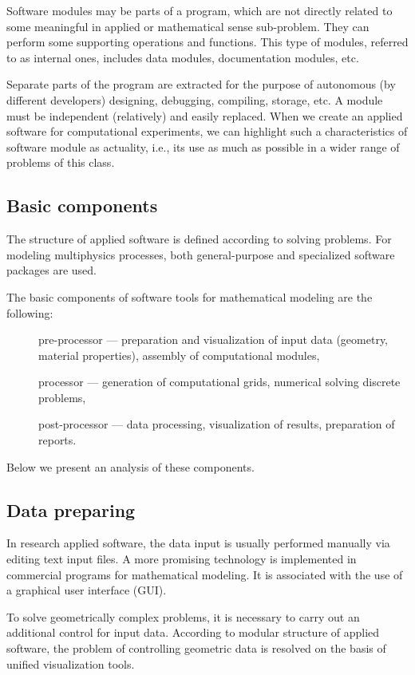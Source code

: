 \documentclass{elsarticle}
\begin{document}
Software modules may be parts of a program, which are not directly related to some meaningful
in applied or mathematical sense sub-problem. They can perform some supporting operations and functions.
This type of modules, referred to as internal ones, includes data modules, documentation modules, etc.

Separate parts of the program are extracted for the purpose of autonomous (by different developers)
designing, debugging, compiling, storage, etc.
A module must be independent (relatively) and easily replaced. 
When we create an  applied software for computational experiments,
we can highlight such a characteristics of software module as actuality, i.e.,
its use as much as possible in a wider range of problems of this class.

\subsection{Basic components}

The structure of applied software is defined according to solving problems.
For modeling multiphysics processes, both general-purpose and specialized software packages are used.

The basic components of software tools for mathematical modeling are the following:
\begin{description}
 \item[\textbullet]  pre-processor --- preparation and visualization of input data (geometry, material properties),
  assembly of computational modules,
 \item[\textbullet]  processor --- generation of computational grids, numerical solving discrete problems,
 \item[\textbullet] post-processor --- data processing, visualization of results, preparation of reports.
\end{description} 
Below we present an analysis of these components. 

\subsection{Data preparing}

In research applied software, the data input is usually performed manually via editing text input files. 
A more promising technology is implemented in commercial programs for mathematical modeling. 
It is associated with the use of a graphical user interface (GUI).

To solve geometrically complex problems, it is necessary to carry out an additional control for input data. 
According to modular structure of applied software, the problem of controlling geometric data is resolved 
on the basis of unified visualization tools.
\end{document}
